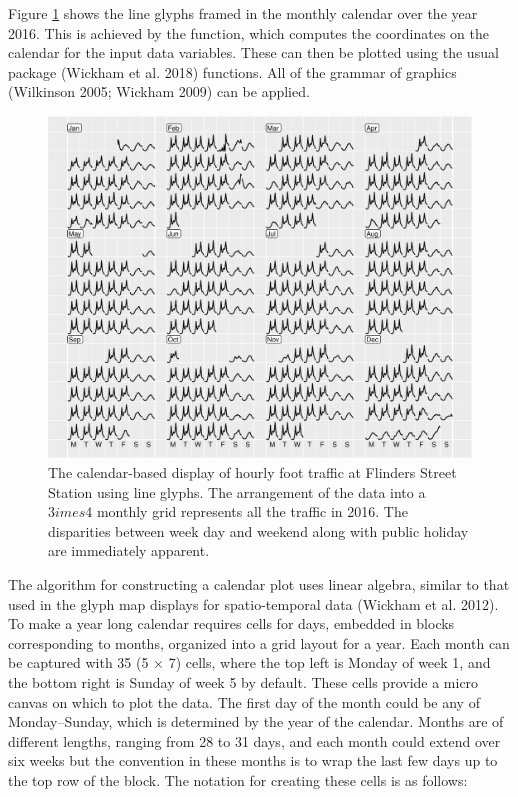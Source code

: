 \label{sec:algorithm}

Figure \ref{fig:flinders-2016} shows the line glyphs framed in the
monthly calendar over the year 2016. This is achieved by the
 function, which computes the coordinates on the
calendar for the input data variables. These can then be plotted using
the usual  package (Wickham et al. 2018) functions. All of
the grammar of graphics (Wilkinson 2005; Wickham 2009) can be applied.

\begin{Schunk}
\begin{figure}

{\centering \includegraphics[width=\textwidth]{figure/flinders-2016-1} 

}

\caption[The calendar-based display of hourly foot traffic at Flinders Street Station using line glyphs]{The calendar-based display of hourly foot traffic at Flinders Street Station using line glyphs. The arrangement of the data into a $3  imes 4$ monthly grid represents all the traffic in 2016. The disparities between week day and weekend along with public holiday are immediately apparent.}\label{fig:flinders-2016}
\end{figure}
\end{Schunk}

The algorithm for constructing a calendar plot uses linear algebra,
similar to that used in the glyph map displays for spatio-temporal data
(Wickham et al. 2012). To make a year long calendar requires cells for
days, embedded in blocks corresponding to months, organized into a grid
layout for a year. Each month can be captured with 35 (5 \(\times\) 7)
cells, where the top left is Monday of week 1, and the bottom right is
Sunday of week 5 by default. These cells provide a micro canvas on which
to plot the data. The first day of the month could be any of
Monday--Sunday, which is determined by the year of the calendar. Months
are of different lengths, ranging from 28 to 31 days, and each month
could extend over six weeks but the convention in these months is to
wrap the last few days up to the top row of the block. The notation for
creating these cells is as follows:

